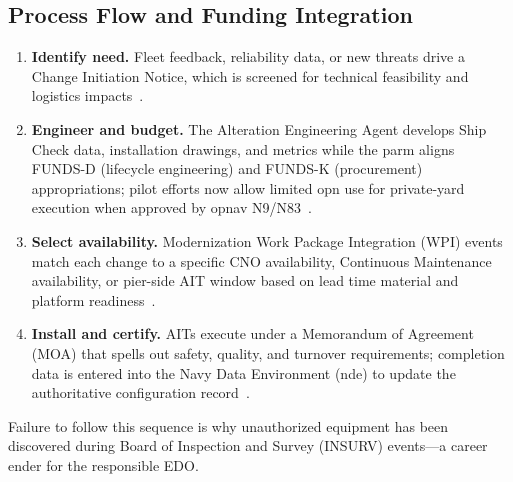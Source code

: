 \documentclass[../main.tex]{subfiles}
\begin{document}
\subsection{Process Flow and Funding Integration}
\begin{enumerate}
\item \textbf{Identify need.} Fleet feedback, reliability data, or new threats drive a Change Initiation Notice, which is screened for technical feasibility and logistics impacts~\autocite{edo-4-1-2-navy-modernization-2025}.
\item \textbf{Engineer and budget.} The Alteration Engineering Agent develops Ship Check data, installation drawings, and metrics while the \ac{parm} aligns FUNDS-D (lifecycle engineering) and FUNDS-K (procurement) appropriations; pilot efforts now allow limited \ac{opn} use for private-yard execution when approved by \ac{opnav} N9/N83~\autocite{edo-4-1-2-navy-modernization-2025,SL720-AA-MAN-030}.
\item \textbf{Select availability.} Modernization Work Package Integration (WPI) events match each change to a specific CNO availability, Continuous Maintenance availability, or pier-side AIT window based on lead time material and platform readiness~\autocite{TS9090-310}.
\item \textbf{Install and certify.} AITs execute under a Memorandum of Agreement (MOA) that spells out safety, quality, and turnover requirements; completion data is entered into the Navy Data Environment (\ac{nde}) to update the authoritative configuration record~\autocite{SL720-AA-MAN-030,TS9090-310}.
\end{enumerate}
Failure to follow this sequence is why unauthorized equipment has been discovered during Board of Inspection and Survey (INSURV) events---a career ender for the responsible EDO.
\end{document}

